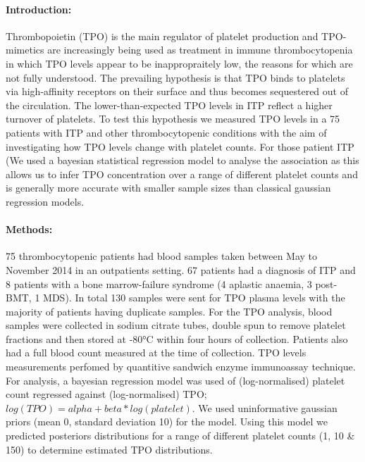 \documentclass[11pt]{article}
\title{}
\author{George Adams .... Nichola Cooper}
\date{July 2018}
\begin{document}
\maketitle

\paragraph{Introduction:} Thrombopoietin (TPO) is the main regulator of platelet production and TPO-mimetics are increasingly being used as treatment in immune thrombocytopenia in which TPO levels appear to be inappropraitely low, the reasons for which are not fully understood. The prevailing hypothesis is that TPO binds to platelets via high-affinity receptors on their surface and thus becomes sequestered out of the circulation. The lower-than-expected TPO levels in ITP reflect a higher turnover of platelets. To test this hypothesis we measured TPO levels in a 75 patients with ITP and other thrombocytopenic conditions with the aim of investigating how TPO levels change with platelet counts. For those patient ITP (We used a bayesian statistical regression model to analyse the association as this allows us to infer TPO concentration over a range of different platelet counts and is generally more accurate with smaller sample sizes than classical gaussian regression models.


\paragraph{Methods:} 75 thrombocytopenic patients had blood samples taken between May to November 2014 in an outpatients setting. 67 patients had a diagnosis of ITP and 8 patients with a bone marrow-failure syndrome (4 aplastic anaemia, 3 post- BMT, 1 MDS). In total 130 samples were sent for TPO plasma levels with the majority of patients having duplicate samples. For the TPO analysis, blood samples were collected in sodium citrate tubes, double spun to remove platelet fractions and then stored at -80°C within four hours of collection. Patients also had a full blood count measured at the time of collection. TPO levels measurements perfomed by quantitive sandwich enzyme immunoassay technique. For analysis, a bayesian regression model was used of (log-normalised) platelet count regressed against (log-normalised) TPO; $log(TPO) = alpha + beta*log(platelet)$. We used uninformative gaussian priors (mean 0, standard deviation 10) for the model. Using this model we predicted posteriors distributions for a range of different platelet counts (1, 10 & 150) to determine estimated TPO distributions.
\end{document}
